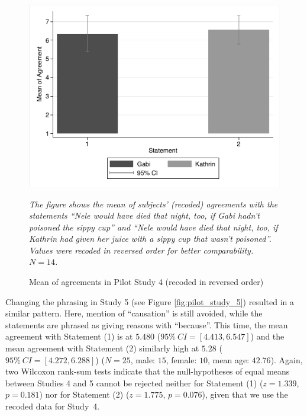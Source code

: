 \documentclass[egregdoesnotlikesansseriftitles,12pt]{scrartcl}
\begin{document}
\begin{figure}[H]
   \centering
   \includegraphics[scale=0.8]{figures/pilot_study_4.pdf}
   \begin{minipage}{0.9\linewidth}
   \footnotesize
   \emph{The figure shows the mean of subjects' (recoded) agreements with the statements ``Nele would have died that night, too, if Gabi hadn't poisoned the sippy cup'' and ``Nele would have died that night, too, if Kathrin had given her juice with a sippy cup that wasn't poisoned''. Values were recoded in reversed order for better comparability. $N=14$.}
   \end{minipage}
   \caption{Mean of agreements in Pilot Study 4 (recoded in reversed order)}
   \label{fig:pilot_study_4}
\end{figure}

\noindent Changing the phrasing in Study 5 (see Figure \ref{fig:pilot_study_5}) resulted in a similar pattern. Here, mention of ``causation'' is still avoided, while the statements are phrased as giving reasons with ``because''. This time, the mean agreement with Statement (1) is at $5.480$ ($95\%~CI=[4.413,6.547]$) and the mean agreement with Statement (2) similarly high at $5.28$ ($95\%~CI=[4.272,6.288]$) ($N=25$, male: $15$, female: $10$, mean age: $42.76$). Again, two Wilcoxon rank-sum tests indicate that the null-hypotheses of equal means between Studies 4 and 5 cannot be rejected neither for Statement (1) ($z=1.339$, $p=0.181$) nor for Statement (2) ($z=1.775$, $p=0.076$), given that we use the recoded data for Study~4.
\end{document}
